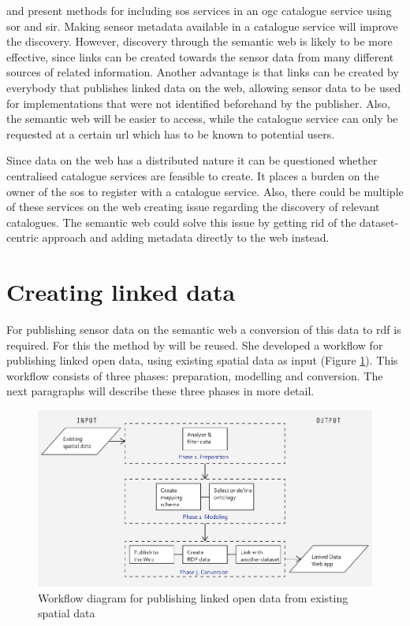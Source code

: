 \cite{SW:OGC4} and \cite{SW:OGC3} present methods for including \ac{sos} services in an \ac{ogc} catalogue service using \ac{sor} and \ac{sir}. Making sensor metadata available in a catalogue service will improve the discovery. However, discovery through the semantic web is likely to be more effective, since links can be created towards the sensor data from many different sources of related information. Another advantage is that links can be created by everybody that publishes linked data on the web, allowing sensor data to be used for implementations that were not identified beforehand by the publisher. Also, the semantic web will be easier to access, while the catalogue service can only be requested at a certain \ac{url} which has to be known to potential users. 

Since data on the web has a distributed nature it can be questioned whether centralised catalogue services are feasible to create. It places a burden on the owner of the \ac{sos} to register with a catalogue service. Also, there could be multiple of these services on the web creating issue regarding the discovery of relevant catalogues. The semantic web could solve this issue by getting rid of the dataset-centric approach and adding metadata directly to the web instead.

\section{Creating linked data}
\label{par:missier}
For publishing sensor data on the semantic web a conversion of this data to \ac{rdf} is required. For this the method by \cite{LD:Missier} will be reused. She developed a workflow for publishing linked open data, using existing spatial data as input (Figure \ref{fig:missier}). This workflow consists of three phases: preparation, modelling and conversion. The next paragraphs will describe these three phases in more detail.

\begin{figure}
	\centering
	\includegraphics[width=1\linewidth]{UML/workflowMissier.png}
	\caption{Workflow diagram for publishing linked open data from existing spatial data \citep[p. 28]{LD:Missier}}
	\label{fig:missier}
\end{figure}

